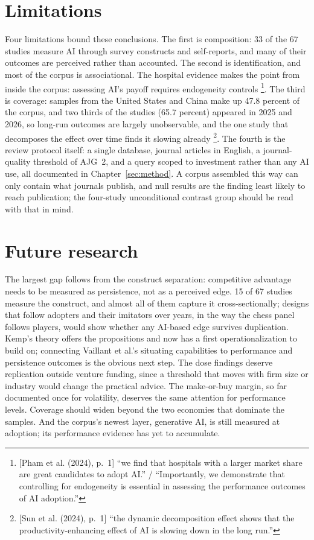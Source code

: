\section{Limitations}
\label{sec:disc-limitations}

Four limitations bound these conclusions. The first is composition: 33 of the 67
studies measure AI through survey constructs and self-reports, and many of their
outcomes are perceived rather than accounted. The second is identification, and most of the corpus is associational. The hospital
evidence makes the point from inside the corpus: assessing AI's payoff requires
endogeneity controls \parencite[p.~1]{pham2024determinants}\footnote{[Pham et al.
(2024), p.~1] ``we find that hospitals with a larger market share are great candidates
to adopt AI.'' / ``Importantly, we demonstrate that controlling for endogeneity is
essential in assessing the performance outcomes of AI adoption.''}. The third is coverage: samples
from the United States and China make up 47.8 percent of the corpus, and two thirds of
the studies (65.7 percent) appeared in 2025 and 2026, so long-run outcomes are largely
unobservable, and the one study that decomposes the effect over time finds it slowing
already \parencite[p.~1]{sun2024deconstruct}\footnote{[Sun et al. (2024), p.~1] ``the
dynamic decomposition effect shows that the productivity-enhancing effect of AI is
slowing down in the long run.''}. The fourth is the review protocol itself: a single
database, journal articles in English, a journal-quality threshold of AJG~2, and a
query scoped to investment rather than any AI use, all documented in
Chapter~\ref{sec:method}. A corpus assembled this way can only contain what journals
publish, and null results are the finding least likely to reach publication; the
four-study unconditional contrast group should be read with that in mind.

\section{Future research}
\label{sec:disc-future}

The largest gap follows from the construct separation: competitive advantage needs to
be measured as persistence, not as a perceived edge. 15 of 67 studies measure the
construct, and almost all of them capture it cross-sectionally; designs that follow
adopters and their imitators over years, in the way the chess panel follows players,
would show whether any AI-based edge survives duplication. Kemp's theory offers the
propositions and now has a first operationalization to build on; connecting Vaillant et
al.'s situating capabilities to performance and persistence outcomes is the obvious
next step. The dose findings deserve replication outside venture funding, since a
threshold that moves with firm size or industry would change the practical advice.
The make-or-buy margin, so far documented once for volatility, deserves the same
attention for performance levels. Coverage should widen beyond the two economies that
dominate the samples. And the corpus's newest layer, generative AI, is still measured
at adoption; its performance evidence has yet to accumulate.
